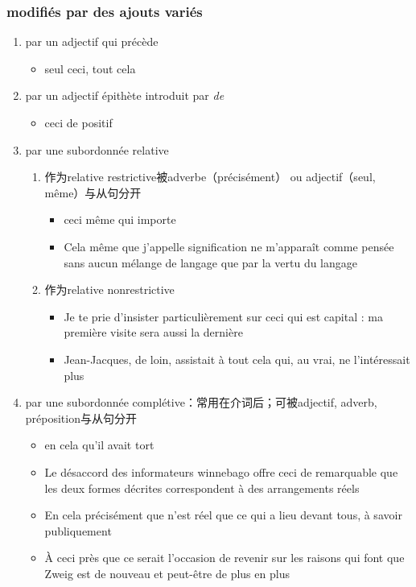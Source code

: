 \documentclass[UTF8]{report}
\begin{document}
\subsubsection{modifiés par des ajouts variés}
\begin{enumerate}
    \item par un adjectif qui précède
    \begin{itemize}
        \item seul ceci, tout cela
    \end{itemize}
    \item par un adjectif épithète introduit par \textit{de}
    \begin{itemize}
        \item ceci de positif
    \end{itemize}
    \item par une subordonnée relative
    \begin{enumerate}
        \item 作为relative restrictive被adverbe（précisément） ou adjectif（seul, même）与从句分开
        \begin{itemize}
            \item ceci même qui importe
            \item Cela même que j’appelle signification ne m’apparaît comme pensée sans aucun mélange de langage que par la vertu du langage
        \end{itemize}
        \item 作为relative nonrestrictive
        \begin{itemize}
            \item Je te prie d’insister particulièrement sur ceci qui est capital : ma première visite sera aussi la dernière
            \item Jean-Jacques, de loin, assistait à tout cela qui, au vrai, ne l’intéressait plus
        \end{itemize}
    \end{enumerate}
    \item par une subordonnée complétive：常用在介词后；可被adjectif, adverb, préposition与从句分开
    \begin{itemize}
        \item en cela qu’il avait tort
        \item Le désaccord des informateurs winnebago offre ceci de remarquable que les deux formes décrites correspondent à des arrangements réels
        \item En cela précisément que n’est réel que ce qui a lieu devant tous, à savoir publiquement
        \item À ceci près que ce serait l’occasion de revenir sur les raisons qui font que Zweig est de nouveau et peut-être de plus en plus
    \end{itemize}
\end{enumerate}
\end{document}
